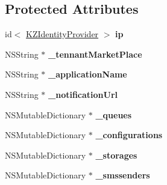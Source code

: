 \subsection*{Protected Attributes}
\begin{DoxyCompactItemize}
\item 
\hypertarget{interface_k_z_application_a3602916402fdcfb57cffc0e2516e6cf9}{id$<$ \hyperlink{protocol_k_z_identity_provider-p}{K\-Z\-Identity\-Provider} $>$ {\bfseries ip}}\label{interface_k_z_application_a3602916402fdcfb57cffc0e2516e6cf9}

\item 
\hypertarget{interface_k_z_application_a015cfa54840b8f8d52c51b3008eb33dc}{N\-S\-String $\ast$ {\bfseries \-\_\-tennant\-Market\-Place}}\label{interface_k_z_application_a015cfa54840b8f8d52c51b3008eb33dc}

\item 
\hypertarget{interface_k_z_application_a9e43ef7fc3c3bbf11d726777f28b44b5}{N\-S\-String $\ast$ {\bfseries \-\_\-application\-Name}}\label{interface_k_z_application_a9e43ef7fc3c3bbf11d726777f28b44b5}

\item 
\hypertarget{interface_k_z_application_a6d9248d65d426115b9eb16414e9af94e}{N\-S\-String $\ast$ {\bfseries \-\_\-notification\-Url}}\label{interface_k_z_application_a6d9248d65d426115b9eb16414e9af94e}

\item 
\hypertarget{interface_k_z_application_aebd2fed2ab965c8a8cc0e92f4c9443c7}{N\-S\-Mutable\-Dictionary $\ast$ {\bfseries \-\_\-queues}}\label{interface_k_z_application_aebd2fed2ab965c8a8cc0e92f4c9443c7}

\item 
\hypertarget{interface_k_z_application_a4aea415e5d1546dfe4f4579c5dbc68c7}{N\-S\-Mutable\-Dictionary $\ast$ {\bfseries \-\_\-configurations}}\label{interface_k_z_application_a4aea415e5d1546dfe4f4579c5dbc68c7}

\item 
\hypertarget{interface_k_z_application_a81bbc09fa654e6f5cca2287089878a75}{N\-S\-Mutable\-Dictionary $\ast$ {\bfseries \-\_\-storages}}\label{interface_k_z_application_a81bbc09fa654e6f5cca2287089878a75}

\item 
\hypertarget{interface_k_z_application_a322c17bcd713c7e0756f4f5162843842}{N\-S\-Mutable\-Dictionary $\ast$ {\bfseries \-\_\-smssenders}}\label{interface_k_z_application_a322c17bcd713c7e0756f4f5162843842}


\end{DoxyCompactItemize}
